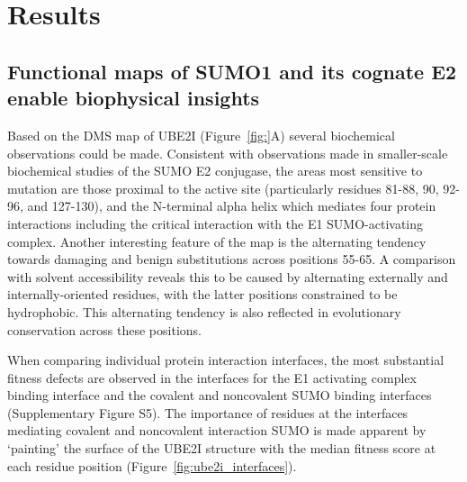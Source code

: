 \section{Results}


\subsection{Functional maps of SUMO1 and its cognate E2 enable biophysical insights}


Based on the DMS map of UBE2I (Figure~\ref{fig:}A) several biochemical observations could be made. Consistent with observations made in smaller-scale biochemical studies of the SUMO E2 conjugase\cite{bencsath_identification_2002,bernier-villamor_structural_2002}, the areas most sensitive to mutation are those proximal to the active site (particularly residues 81-88, 90, 92-96, and 127-130), and the N-terminal alpha helix which mediates four protein interactions including the critical interaction with the E1 SUMO-activating complex. Another interesting feature of the map is the alternating tendency towards damaging and benign substitutions across positions 55-65. A comparison with solvent accessibility reveals this to be caused by alternating externally and internally-oriented residues, with the latter positions constrained to be hydrophobic. This alternating tendency is also reflected in evolutionary conservation across these positions.

When comparing individual protein interaction interfaces, the most substantial fitness defects are observed in the interfaces for the E1 activating complex binding interface and the  covalent and noncovalent SUMO binding interfaces  (Supplementary Figure S5).  The importance of residues at the interfaces mediating covalent and noncovalent interaction SUMO is made apparent by ‘painting’ the surface of the UBE2I structure with the median fitness score at each residue position (Figure~\ref{fig:ube2i_interfaces}). 


